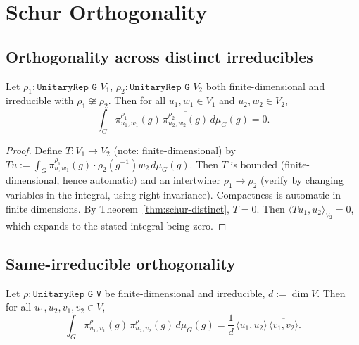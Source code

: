 \chapter{Schur Orthogonality}
\label{chap:orthog}

\section{Orthogonality across distinct irreducibles}

\begin{theorem}
  \label{thm:mc-orthog-distinct}
  Let $\rho_1 : \texttt{UnitaryRep G $V_1$}$,
  $\rho_2 : \texttt{UnitaryRep G $V_2$}$ both finite-dimensional and
  irreducible with $\rho_1 \not\cong \rho_2$. Then for all
  $u_1, w_1 \in V_1$ and $u_2, w_2 \in V_2$,
  \[
     \int_G \pi_{u_1, w_1}^{\rho_1}(g)\, \overline{\pi_{u_2, w_2}^{\rho_2}(g)}\, d\mu_G(g) = 0.
  \]
\end{theorem}

\begin{proof}
  Define $T : V_1 \to V_2$ (note: finite-dimensional) by
  $T u := \int_G \pi_{u, w_1}^{\rho_1}(g) \cdot \rho_2(g^{-1}) w_2\, d\mu_G(g)$.
  Then $T$ is bounded (finite-dimensional, hence automatic) and an
  intertwiner $\rho_1 \to \rho_2$ (verify by changing variables in the
  integral, using right-invariance). Compactness is automatic in finite
  dimensions. By Theorem~\ref{thm:schur-distinct}, $T = 0$.
  Then $\langle T u_1, u_2\rangle_{V_2} = 0$, which expands to the
  stated integral being zero.
\end{proof}

\section{Same-irreducible orthogonality}

\begin{theorem}
  \label{thm:mc-orthog-same}
  Let $\rho : \texttt{UnitaryRep G V}$ be finite-dimensional and
  irreducible, $d := \dim V$. Then for all $u_1, u_2, v_1, v_2 \in V$,
  \[
     \int_G \pi_{u_1, v_1}^{\rho}(g)\, \overline{\pi_{u_2, v_2}^{\rho}(g)}\, d\mu_G(g)
     = \frac{1}{d}\,\langle u_1, u_2\rangle\,\overline{\langle v_1, v_2\rangle}.
  \]
\end{theorem}

